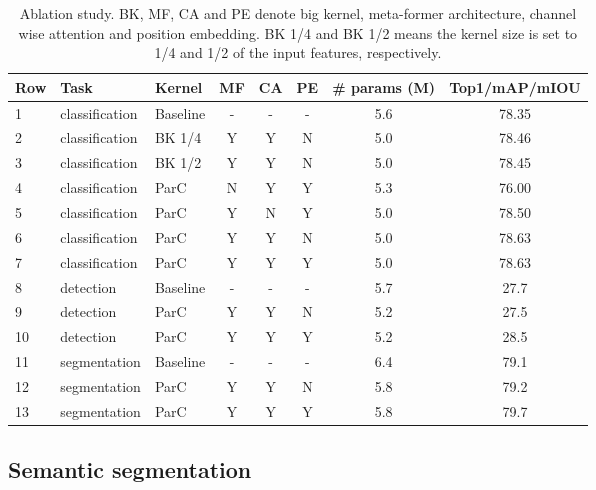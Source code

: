 \documentclass[10pt,twocolumn,letterpaper]{article}
\begin{document}
\begin{table*}
\renewcommand\arraystretch{0.9}
\begin{center}

\begin{tabular}{l|l|l|ccc|c|c}
\hline
Row & Task &   Kernel  &  MF  &  CA  & PE & \# params (M) &Top1/mAP/mIOU
\\
\hline
1 & classification &  Baseline         &   -   &   -    & -   & 5.6   & 78.35 \\
2 & classification &  BK 1/4           &   Y   &   Y    & N   & 5.0 & 78.46 \\
3 & classification &  BK 1/2           &   Y   &   Y    & N   & 5.0 & 78.45 \\
4 & classification &  ParC              &   N   &   Y    & Y   & 5.3 & 76.00 \\
5 & classification &  ParC              &   Y   &   N    & Y   & 5.0 & 78.50 \\
6 & classification &  ParC              &   Y   &   Y    & N   & 5.0 & 78.63 \\
7 & classification &  ParC              &   Y   &   Y    & Y   & 5.0 & 78.63 \\
\hline
8 & detection      &  Baseline         &   -   &   -    & -   & 5.7   & 27.7   \\
9 & detection      &  ParC              &   Y   &   Y    & N   & 5.2 & 27.5      \\
10 & detection     &  ParC              &   Y   &   Y    & Y   & 5.2   & 28.5   \\
\hline
11 & segmentation  &  Baseline         &   -   &   -    & -   & 6.4   & 79.1   \\
12 & segmentation  &  ParC              &   Y   &   Y    & N   & 5.8   & 79.2   \\
13 & segmentation  &  ParC              &   Y   &   Y    & Y   & 5.8   & 79.7   \\
  
\hline
\end{tabular}

\label{tab:ablation}
\end{center}
\caption{Ablation study. BK, MF, CA and PE denote big kernel, meta-former architecture, channel wise attention and position embedding. BK 1/4 and BK 1/2 means the kernel size is set to 1/4 and 1/2 of the input features, respectively.}
\end{table*}


\subsection{Semantic segmentation} 
\end{document}

